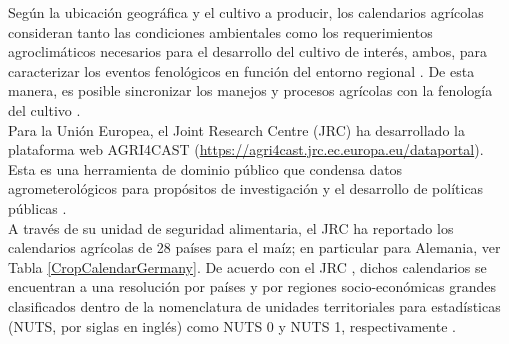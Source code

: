 Según la ubicación geográfica y el cultivo a producir, los calendarios agrícolas consideran tanto las condiciones ambientales como los requerimientos agroclimáticos necesarios para el desarrollo del cultivo de interés, ambos, para caracterizar los eventos fenológicos en función del entorno regional \cite{Zhang_2025_maize}. De esta manera, es posible sincronizar los manejos y procesos agrícolas con la fenología del cultivo \cite{GarciaTejera_2022}.\\

Para la Unión Europea, el Joint Research Centre (JRC) ha desarrollado la plataforma web AGRI4CAST (\url{https://agri4cast.jrc.ec.europa.eu/dataportal}). Esta es una herramienta de dominio público que condensa datos agrometerológicos para propósitos de investigación y el desarrollo de políticas públicas \cite{Biavetti_2014}.\\

A través de su unidad de seguridad alimentaria, el JRC ha reportado los calendarios agrícolas de 28 países para el maíz; en particular para Alemania, ver Tabla \ref{CropCalendarGermany}. De acuerdo con el JRC \cite{Agri4Cast_2026}, dichos calendarios se encuentran a una resolución por países y por regiones socio-económicas grandes clasificados dentro de la nomenclatura de unidades territoriales para estadísticas (NUTS, por siglas en inglés) como  NUTS 0 y NUTS 1, respectivamente \cite{Eurostat_NUTS}.\\


